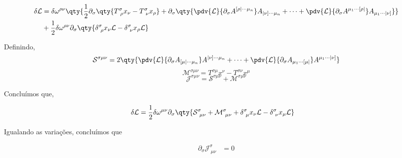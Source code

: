 \documentclass[twoside]{amsart}
\numberwithin{equation}{section}
\begin{document}
\begin{refsection}
\begin{align}
    \delta\mathcal L&=\delta\omega^{\rho\nu}\qty{\frac12\partial_\sigma\qty{T^{\sigma}_{\ \rho}x_\nu-T^\sigma_{\ \nu}x_\rho}+\partial_\sigma\qty{\pdv{\mathcal L}{\partial_\sigma A^{[\rho|\cdots\mu_n}}A_{|\nu]\cdots\mu_n}+\cdots+\pdv{\mathcal L}{\partial_\sigma A^{\mu_1\cdots[\rho|}}A_{\mu_1\cdots|\nu]}}}\\
    &+\frac12\delta\omega^{\rho\nu}\partial_\sigma\qty{\delta^\sigma_{\ \rho}x_\nu\mathcal L-\delta^\sigma_{\ \nu}x_\rho\mathcal L}
\end{align}

Definindo,$$\mathcal S^{\sigma\mu\nu}=2\qty{\pdv{\mathcal L}{\partial_\sigma A_{[\mu|\cdots\mu_n}}A^{|\nu]\cdots\mu_n}+\cdots+\pdv{\mathcal L}{\partial_\sigma A_{\mu_1\cdots[\mu|}}A^{\mu_1\cdots|\nu]}}$$ $$\mathcal M^{\sigma\mu\nu}=T^{\sigma\mu}x^\nu-T^{\sigma\nu}x^\mu$$ $$\mathcal J^{\sigma\mu\nu}=\mathcal S^{\sigma\mu\nu}+\mathcal M^{\sigma\mu\nu}$$

Concluímos que,

\begin{align}
    \delta\mathcal L&=\frac12\delta\omega^{\mu\nu}\partial_\sigma\qty{\mathcal S^{\sigma}_{\ \mu\nu}+\mathcal M^{\sigma}_{\ \mu\nu}+\delta^\sigma_{\ \mu}x_\nu\mathcal L-\delta^{\sigma}_{\ \nu}x_\mu\mathcal L}
\end{align}

Igualando as variações, concluímos que 

\begin{align}
    \partial_\sigma\mathcal J^{\sigma}_{\ \mu\nu}&=0
\end{align}

\printbibliography[heading=subbibliography]
\end{refsection}

\end{document}
